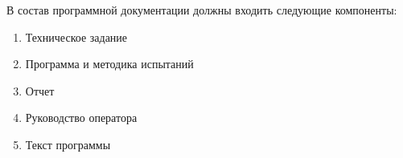 В состав программной документации должны входить следующие компоненты:
\begin{enumerate}
    \item Техническое задание
    \item Программа и методика испытаний
    \item Отчет
    \item Руководство оператора
    \item Текст программы
\end{enumerate}
